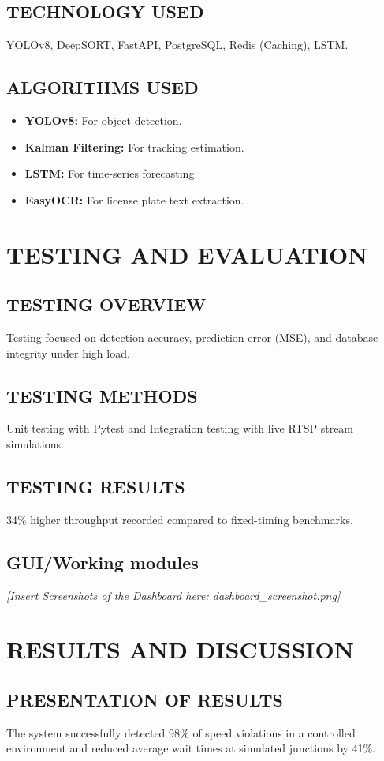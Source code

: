 \documentclass[12pt,times,a4paper]{report}
\begin{document}
\section{TECHNOLOGY USED}
YOLOv8, DeepSORT, FastAPI, PostgreSQL, Redis (Caching), LSTM.
\section{ALGORITHMS USED}
\begin{itemize}
    \item \textbf{YOLOv8:} For object detection.
    \item \textbf{Kalman Filtering:} For tracking estimation.
    \item \textbf{LSTM:} For time-series forecasting.
    \item \textbf{EasyOCR:} For license plate text extraction.
\end{itemize}

\chapter{TESTING AND EVALUATION}
\section{TESTING OVERVIEW}
Testing focused on detection accuracy, prediction error (MSE), and database integrity under high load.
\section{TESTING METHODS}
Unit testing with Pytest and Integration testing with live RTSP stream simulations.
\section{TESTING RESULTS}
34\% higher throughput recorded compared to fixed-timing benchmarks.
\section{GUI/Working modules}
\textit{[Insert Screenshots of the Dashboard here: dashboard_screenshot.png]}

\chapter{RESULTS AND DISCUSSION}
\section{PRESENTATION OF RESULTS}
The system successfully detected 98\% of speed violations in a controlled environment and reduced average wait times at simulated junctions by 41\%.
\end{document}
